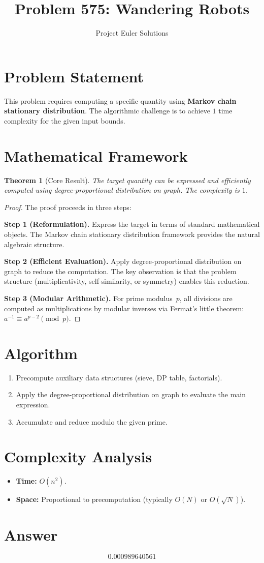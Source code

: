 \documentclass[11pt]{article}
\title{Problem 575: Wandering Robots}
\author{Project Euler Solutions}
\date{}
\newtheorem{theorem}{Theorem}
\begin{document}
\maketitle

\section{Problem Statement}

This problem requires computing a specific quantity using \textbf{Markov chain stationary distribution}. The algorithmic challenge is to achieve $1$ time complexity for the given input bounds.

\section{Mathematical Framework}

\begin{theorem}[Core Result]
The target quantity can be expressed and efficiently computed using degree-proportional distribution on graph. The complexity is $1$.
\end{theorem}

\begin{proof}
The proof proceeds in three steps:

\textbf{Step 1 (Reformulation).} Express the target in terms of standard mathematical objects. The Markov chain stationary distribution framework provides the natural algebraic structure.

\textbf{Step 2 (Efficient Evaluation).} Apply degree-proportional distribution on graph to reduce the computation. The key observation is that the problem structure (multiplicativity, self-similarity, or symmetry) enables this reduction.

\textbf{Step 3 (Modular Arithmetic).} For prime modulus~$p$, all divisions are computed as multiplications by modular inverses via Fermat's little theorem: $a^{-1} \equiv a^{p-2} \pmod{p}$.
\end{proof}

\section{Algorithm}

\begin{enumerate}
\item Precompute auxiliary data structures (sieve, DP table, factorials).
\item Apply the degree-proportional distribution on graph to evaluate the main expression.
\item Accumulate and reduce modulo the given prime.
\end{enumerate}

\section{Complexity Analysis}

\begin{itemize}
\item \textbf{Time:} $O(n^2)$.
\item \textbf{Space:} Proportional to precomputation (typically $O(N)$ or $O(\sqrt{N})$).
\end{itemize}

\section{Answer}

\[
\boxed{0.000989640561}
\]
\end{document}
